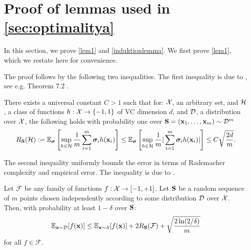 \section{Proof of lemmas used in \cref{sec:optimalitya}}\label{appendixoptimallityofdeterministicprocess}
In this section, we prove \cref{lem1} and \cref{induktionlemma}.
We first prove \cref{lem1}, which we restate here for convenience.

\lemone*  
  The proof follows by the following two inequalities. The first inequality is due to \cite{rademacherDudley1978}, see e.g. Theorem 7.2 \cite{rademacherboundlecturenotes}.
  \begin{lemma}\label{rademacherbound}
  There exists a universal constant $C>1$ such that for: $\mathcal{X}$, an arbitrary set, and $\mathcal{H}$, a class of functions $h: \mathcal{X} \rightarrow\{-1,1\}$ of VC dimension $d$, and $ \mathcal{D} $, a distribution over $ \mathcal{X} $, the following holds with probability one over $ \mathbf{S}=(\mathbf{x}_1,\ldots,\mathbf{x}_m)\sim \mathcal{D}^{m}$ 
    \begin{align*}
      R_{\mathbf{S}}(\mathcal{H}):=\mathbb{E}_{\bm{\sigma}}\left[\sup_{h \in \mathcal{H}} \frac{1}{m} \sum_{i=1}^{m} \bm{\sigma}_i  h(\mathbf{x}_i)\right]\leq \mathbb{E}_{\bm{\sigma}}\left[\sup_{h \in \mathcal{H}} \frac{1}{m} |\sum_{i=1}^{m} \bm{\sigma}_i  h(\mathbf{x}_i)|\right]\leq C \sqrt{\frac{2d}{m}}.
  \end{align*}
  \end{lemma}
  
  The second inequality uniformly bounds the error in terms of Rademacher complexity and empirical error. The inequality is due to \cite{Bartlett2003RademacherAG}.
  \begin{lemma}\label{lem:boostingbook}
  
  Let $\mathcal{F}$ be any family of functions $f: \mathcal{X} \rightarrow[-1,+1]$. Let $\mathbf{S}$ be a random sequence of $m$ points chosen independently according to some distribution $\mathcal{D}$ over $\mathcal{X}$. Then, with probability at least $1-\delta$ over $\mathbf{S}$: $$
  \mathbb{E}_{\mathbf{x} \sim \mathcal{D}}[f(\mathbf{x})] \leq \mathbb{E}_{\mathbf{x} \sim S}[f(\mathbf{x})]+2 R_{\mathbf{S}}(\mathcal{F})+\sqrt{\frac{2 \ln (2 / \delta)}{m}}
  $$
  for all $f \in \mathcal{F}$.
  
  \end{lemma}
  
